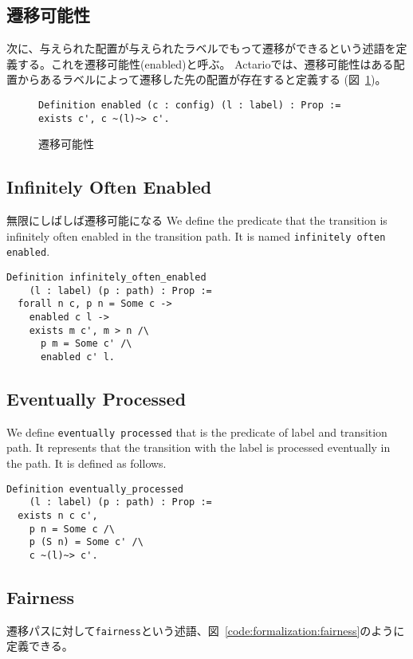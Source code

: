 \subsection{遷移可能性}
次に、与えられた配置が与えられたラベルでもって遷移ができるという述語を定義する。これを遷移可能性(enabled)と呼ぶ。
Actarioでは、遷移可能性はある配置からあるラベルによって遷移した先の配置が存在すると定義する (図~\ref{code:formalization:enabled})。

\begin{figure}[tp]
  \begin{lstlisting}
Definition enabled (c : config) (l : label) : Prop := exists c', c ~(l)~> c'.
  \end{lstlisting}
  \label{code:formalization:enabled}
  \caption{遷移可能性}
\end{figure}

\subsection{Infinitely Often Enabled}
無限にしばしば遷移可能になる
We define the predicate that the transition is infinitely often enabled in the transition path.
It is named \texttt{infinitely often enabled}.

\begin{lstlisting}
Definition infinitely_often_enabled
    (l : label) (p : path) : Prop :=
  forall n c, p n = Some c ->
    enabled c l ->
    exists m c', m > n /\
      p m = Some c' /\
      enabled c' l.
\end{lstlisting}


\subsection{Eventually Processed}
We define \texttt{eventually processed} that is the predicate of label and transition path.
It represents that the transition with the label is processed eventually in the path.
It is defined as follows.

\begin{lstlisting}
Definition eventually_processed
    (l : label) (p : path) : Prop :=
  exists n c c',
    p n = Some c /\
    p (S n) = Some c' /\
    c ~(l)~> c'.
\end{lstlisting}


\subsection{Fairness}
遷移パスに対して\texttt{fairness}という述語、図~\ref{code:formalization:fairness}のように定義できる。

